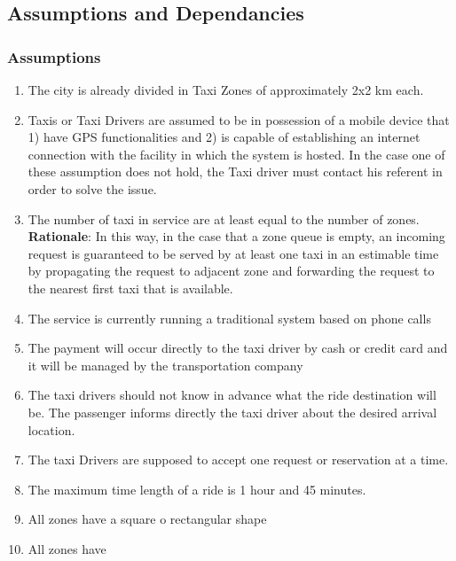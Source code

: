 \documentclass[11pt, a4paper,titlepage]{article}
\begin{document}
\subsection{Assumptions and Dependancies}
\subsubsection{Assumptions}
	\begin{enumerate}
		\item \label{itm: Assumption_Zones} The city is already divided in Taxi Zones of approximately 2x2 km each. 
		\item \label{itm: Assumption_MobileProvisioning} Taxis or Taxi Drivers are assumed to be in possession of a mobile device that  1) have GPS functionalities and 2) is capable of establishing an internet connection with the facility in which the system is hosted. In the case one of these assumption does not hold, the Taxi driver must contact his referent in order to solve the issue.
		\item \label{itm: Assumption_NumberOfTaxis} The number of taxi in service are at least equal to the number of zones.
		\textbf{Rationale}: In this way, in the case that a zone queue is empty, an incoming request is guaranteed to be served by at least one taxi in an estimable time by propagating the request to adjacent zone and forwarding the request to the nearest first taxi that is available.
		\item \label{itm: Assumption_FormerSystems} The service is currently running a traditional system based on phone calls	
		\item \label{itm: Assumption_Payment} The payment will occur directly to the taxi driver by cash or credit card and it will be managed by the transportation company
		\item \label{itm: Assumption_Destination} The taxi drivers should not know in advance what the ride destination will be. The passenger informs directly the taxi driver about the desired arrival location.
		\item \label{itm: Assumption_OneReservation} The taxi Drivers are supposed to accept one request or reservation at a time.
		\item \label{itm: Assumption_LengthTime} The maximum time length of a ride is 1 hour and 45 minutes.
		\item \label{itm: Assumption_SquareZones} All zones have a square o rectangular shape
		\item \label{itm: Assumption_Coverage} All zones have
	\end{enumerate}
\pagebreak
\end{document}
